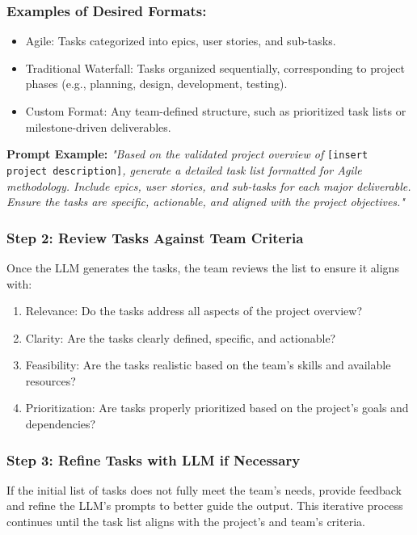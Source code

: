 \documentclass[14pt, a4paper]{article}
\begin{document}
\subsubsection*{Examples of Desired Formats:}

\begin{itemize}
    \item Agile: Tasks categorized into epics, user stories, and sub-tasks.
    \item Traditional Waterfall: Tasks organized sequentially, corresponding to
    project phases (e.g., planning, design, development, testing).
    \item Custom Format: Any team-defined structure, such as prioritized task
    lists or milestone-driven deliverables.
\end{itemize}

\textbf{Prompt Example:} \textit{"Based on the validated project overview of}
\texttt{[insert project description]}\textit{, generate a detailed task list
formatted for Agile methodology.  Include epics, user stories, and sub-tasks for
each major deliverable. Ensure the tasks are specific, actionable, and aligned
with the project objectives."}

\subsubsection*{Step 2: Review Tasks Against Team Criteria}

Once the LLM generates the tasks, the team reviews the list to ensure it aligns
with:

\begin{enumerate}
    \item Relevance: Do the tasks address all aspects of the project overview?
    \item Clarity: Are the tasks clearly defined, specific, and actionable?
    \item Feasibility: Are the tasks realistic based on the team's skills and
    available resources?
    \item Prioritization: Are tasks properly prioritized based on the project's
    goals and dependencies?
\end{enumerate}

\subsubsection*{Step 3: Refine Tasks with LLM if Necessary}

If the initial list of tasks does not fully meet the team's needs, provide
feedback and refine the LLM's prompts to better guide the output. This iterative
process continues until the task list aligns with the project’s and team’s
criteria.
\end{document}
